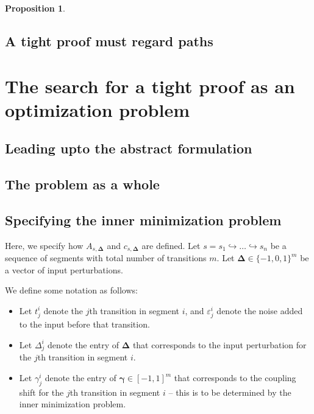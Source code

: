 \documentclass{article}
\newtheorem{proposition}{Proposition}[section]
\renewcommand{\epsilon}{\varepsilon}
\newcommand{\1}{\langle 1 \rangle}
\newcommand{\2}{\langle 2 \rangle}
\begin{document}
\begin{proposition}
    
\end{proposition}

\subsection{A tight proof must regard paths}

\section{The search for a tight proof as an optimization problem}

\subsection{Leading upto the abstract formulation}

\subsection{The problem as a whole}


\subsection{Specifying the inner minimization problem}

Here, we specify how $A_{s, \boldsymbol{\Delta}}$ and $c_{s, \boldsymbol{\Delta}}$ are defined. Let $s = s_1 \hookrightarrow \dots \hookrightarrow s_n$ be a sequence of segments with total number of transitions $m$. Let $\boldsymbol{\Delta} \in \{-1, 0, 1\}^m$ be a vector of input perturbations.

We define some notation as follows: 

\begin{itemize}
    \item Let $t^i_j$ denote the $j$th transition in segment $i$, and $\epsilon^i_j$ denote the noise added to the input before that transition.
    \item Let $\Delta^i_j$ denote the entry of $\boldsymbol{\Delta}$ that corresponds to the input perturbation for the $j$th transition in segment $i$.
    \item Let $\gamma^i_j$ denote the entry of $\boldsymbol{\gamma} \in [-1, 1]^m$ that corresponds to the coupling shift for the $j$th transition in segment $i$ -- this is to be determined by the inner minimization problem.
\end{itemize}
\end{document}
